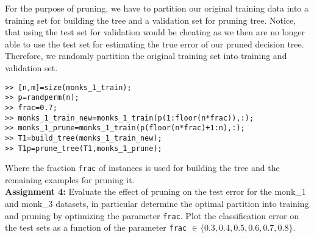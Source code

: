 \documentclass[11pt]{article}
\begin{document}
For the purpose of pruning,
we have to partition our original training data into a training
set for building the tree and a validation set for pruning tree.
Notice, that using the test set for validation would be cheating
as we then are no longer able to use the test set for estimating
the true error of our pruned decision tree. Therefore, we randomly partition
the original training set into training and validation set.
\begin{verbatim}
>> [n,m]=size(monks_1_train);
>> p=randperm(n);
>> frac=0.7;
>> monks_1_train_new=monks_1_train(p(1:floor(n*frac)),:);
>> monks_1_prune=monks_1_train(p(floor(n*frac)+1:n),:);
>> T1=build_tree(monks_1_train_new);
>> T1p=prune_tree(T1,monks_1_prune);
\end{verbatim}
Where the fraction \verb#frac# of instances is used for building the tree
and the remaining examples for pruning it.\\

\noindent
\textbf{Assignment 4:} 
Evaluate the effect of pruning on the test error for the monk\_1 and monk\_3
datasets, in particular determine the optimal partition 
into training and pruning by optimizing the parameter \verb#frac#.
Plot the classification error on the test sets as a function of the 
parameter \verb#frac# $\in \{0.3,0.4,0.5,0.6,0.7,0.8\}$. 
\end{document}
